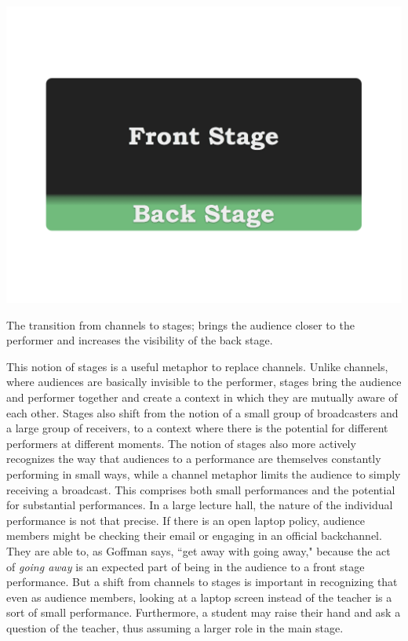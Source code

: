 \begin{marginfigure}
	\includegraphics{figures/front-stage-back-stage.png}
	\caption{The transition from channels to stages; brings the audience closer to the performer and increases the visibility of the back stage.}
	\label{fig:front-back-stage}
\end{marginfigure}

This notion of stages is a useful metaphor to replace channels. Unlike channels, where audiences are basically invisible to the performer, stages bring the audience and performer together and create a context in which they are mutually aware of each other. Stages also shift from the notion of a small group of broadcasters and a large group of receivers, to a context where there is the potential for different performers at different moments. The notion of stages also more actively recognizes the way that audiences to a performance are themselves constantly performing in small ways, while a channel metaphor limits the audience to simply receiving a broadcast. This comprises both small performances and the potential for substantial performances. In a large lecture hall, the nature of the individual performance is not that precise. If there is an open laptop policy, audience members might be checking their email or engaging in an official backchannel.  They are able to, as Goffman says, ``get away with going away," because the act of \emph{going away} is an expected part of being in the audience to a front stage performance. But a shift from channels to stages is important in recognizing that even as audience members, looking at a laptop screen instead of the teacher is a sort of small performance. Furthermore, a student may raise their hand and ask a question of the teacher, thus assuming a larger role in the main stage.

